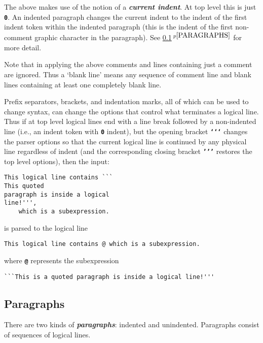 \documentclass[12pt]{article}
\newcommand{\TT}[1]{{\tt \bfseries #1}}
\newcommand{\key}[1]{{\bf \em #1}\index{#1}}
\newcommand{\skey}[2]{{\bf \em #1#2}\index{#1}}
\newcommand{\itemref}[1]{\ref{#1}$\,^{p\pageref{#1}}$}
\newenvironment{indpar}[1][0.3in]%
	{\begin{list}{}%
		     {\setlength{\itemsep}{0in}%
		      \setlength{\topsep}{0in}%
		      \setlength{\parsep}{1ex}%
		      \setlength{\labelwidth}{#1}%
		      \setlength{\leftmargin}{#1}%
		      \addtolength{\leftmargin}{\labelsep}}%
	 \item}%
	{\end{list}}
\begin{document}
The above makes use of the notion of a \key{current indent}.  At top
level this is just \TT{0}.  An indented paragraph changes the current
indent to the indent of the first indent token within the indented
paragraph (this is the indent of the first non-comment graphic character
in the paragraph).  See
\itemref{PARAGRAPHS} for more detail.

Note that in applying the above comments and lines containing
just a comment are ignored.  Thus a `blank line' means any sequence
of comment line and blank lines containing at least one completely
blank line.

Prefix separators, brackets, and indentation marks, all of which
can be used to change syntax, can change the options that control
what terminates a logical line.  Thus if at top level logical
lines end with a line break followed by a non-indented line
(i.e., an indent token with \TT{0} indent),
but the opening bracket \TT{`{}`{}`} changes the parser options so that
the current logical line is continued by any physical line regardless of
indent (and the corresponding closing bracket \TT{'{}'{}'} restores
the top level options), then the input:
\begin{indpar}\begin{verbatim}
This logical line contains ```
This quoted
paragraph is inside a logical
line!''',
    which is a subexpression.
\end{verbatim}\end{indpar}

is parsed to the logical line
\begin{indpar}\begin{verbatim}
This logical line contains @ which is a subexpression.
\end{verbatim}\end{indpar}

where \TT{@} represents the subexpression

\begin{indpar}\begin{verbatim}
```This is a quoted paragraph is inside a logical line!'''
\end{verbatim}\end{indpar}

\subsection{Paragraphs}
\label{PARAGRAPHS}

There are two kinds of \skey{paragraph}s: indented and unindented.
Paragraphs consist of sequences of logical lines.
\end{document}
